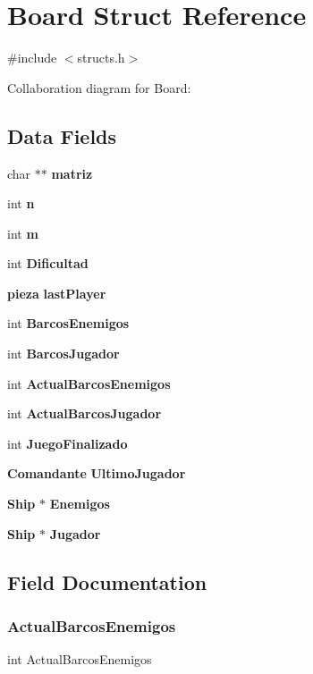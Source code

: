 \section{Board Struct Reference}
\label{struct_board}


{\ttfamily \#include $<$structs.\+h$>$}



Collaboration diagram for Board\+:
\subsection*{Data Fields}
\begin{DoxyCompactItemize}
\item 
char $\ast$$\ast$ {\bf matriz}
\item 
int {\bf n}
\item 
int {\bf m}
\item 
int {\bf Dificultad}
\item 
{\bf pieza} {\bf last\+Player}
\item 
int {\bf Barcos\+Enemigos}
\item 
int {\bf Barcos\+Jugador}
\item 
int {\bf Actual\+Barcos\+Enemigos}
\item 
int {\bf Actual\+Barcos\+Jugador}
\item 
int {\bf Juego\+Finalizado}
\item 
{\bf Comandante} {\bf Ultimo\+Jugador}
\item 
{\bf Ship} $\ast$ {\bf Enemigos}
\item 
{\bf Ship} $\ast$ {\bf Jugador}
\end{DoxyCompactItemize}


\subsection{Field Documentation}
\label{struct_board_a54f0d317ca8ea0658952b3e4587dc7ea} 
\subsubsection{Actual\+Barcos\+Enemigos}
{\footnotesize\ttfamily int Actual\+Barcos\+Enemigos}

\label{struct_board_aa32126699bfb67b5af93fa1e264a6855} 
